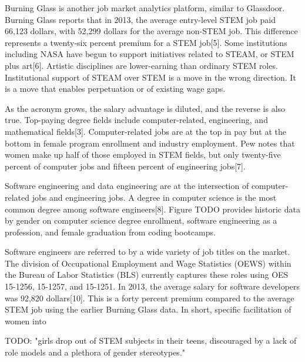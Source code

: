 \documentclass[review]{elsarticle}
\begin{document}
Burning Glass is another job market analytics platform, similar to Glassdoor.
Burning Glass reports that in 2013,
the average entry-level STEM job paid 66,123 dollars,
with 52,299 dollars for the average non-STEM job.
This difference represents a twenty-six percent premium for a STEM job[5].
Some institutions including NASA have begun to support initiatives related to STEAM, or STEM plus art[6].
Artistic disciplines are lower-earning than ordinary STEM roles.
Institutional support of STEAM over STEM is a move in the wrong direction.
It is a move that enables perpetuation or  of existing wage gaps.

As the acronym grows, the salary advantage is diluted, and the reverse is also true.
Top-paying degree fields include computer-related, engineering, and mathematical fields[3].
Computer-related jobs are at the top in pay but at the bottom in female program enrollment and industry employment.
Pew notes that women make up half of those employed in STEM fields,
but only twenty-five percent of computer jobs
and fifteen percent of engineering jobs[7].

Software engineering and data engineering are at the intersection of computer-related jobs and engineering jobs.
A degree in computer science is the most common degree among software engineers[8].
Figure TODO provides historic data by gender on computer science degree enrollment,
software engineering as a profession,
and female graduation from coding bootcamps.

Software engineers are referred to by a wide variety of job titles on the market.
The division of Occupational Employment and Wage Statistics (OEWS)
within the Bureau of Labor Statistics (BLS) currently captures these roles using OES 15-1256,
15-1257, and 15-1251.
In 2013, the average salary for software developers was 92,820 dollars[10].
This is a forty percent premium compared to the average STEM job using the earlier Burning Glass data.
In short, specific facilitation of women into

TODO:
"girls drop out of STEM subjects in their teens, discouraged by a lack of role models and a plethora of gender stereotypes."

\end{document}
